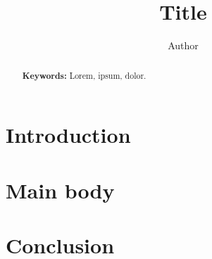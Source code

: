

\title{Title \vspace{0.5cm}}

\author{Author}

\date{\vspace{-2cm}} 


    \maketitle
    \setlength{\parindent}{1.25cm}
    \onehalfspacing
    
    \begin{abstract}
        \normalsize
        \singlespacing
        \noindent \lipsum[1]  
        \vspace{0.5cm}
        
        \noindent \textbf{Keywords:} Lorem, ipsum, dolor.
    \end{abstract}
    
    \section*{Introduction}    
    
    \section*{Main body}
    
    \section*{Conclusion}
    

    \small
    
    

